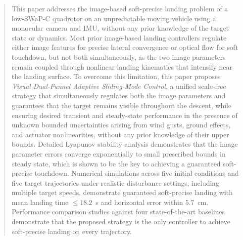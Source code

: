 \documentclass{IEEEtaes}
\begin{document}
\begin{abstract}This paper addresses the image-based soft-precise landing problem of a low-SWaP-C quadrotor on an unpredictable moving vehicle using a monocular camera and IMU, without any prior knowledge of the target state or dynamics. Most prior image-based landing controllers regulate either image features for precise lateral convergence or optical flow for soft touchdown, but not both simultaneously, as the two image parameters remain coupled through nonlinear landing kinematics that intensify near the landing surface. To overcome this limitation, this paper proposes \emph{Visual Dual-Funnel Adaptive Sliding-Mode Control}, a unified scale-free strategy that simultaneously regulates both the image parameters and guarantees that the target remains visible throughout the descent, while ensuring desired transient and steady-state performance in the presence of unknown bounded uncertainties arising from wind gusts, ground effects, and actuator nonlinearities, without any prior knowledge of their upper bounds. Detailed Lyapunov stability analysis demonstrates that the image parameter errors converge exponentially to small prescribed bounds in steady state, which is shown to be the key to achieving a guaranteed soft-precise touchdown. Numerical simulations across five initial conditions and five target trajectories under realistic disturbance settings, including multiple target speeds, demonstrate guaranteed soft-precise landing with mean landing time $\leq 18.2$~s and horizontal error within $5.7$~cm. Performance comparison studies against four state-of-the-art baselines demonstrate that the proposed strategy is the only controller to achieve soft-precise landing on every trajectory.
\end{abstract}

\end{document}
